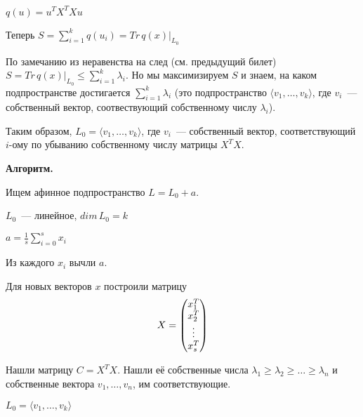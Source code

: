 $q(u) = u^TX^TXu$

Теперь $S = \sum\limits_{i = 1}^k q(u_i) = Tr\, q(x)|_{L_0}$

По замечанию из неравенства на след (см. предыдущий билет) $S = Tr\,q(x)|_{L_0} \le \sum\limits_{i = 1}^k \lambda_i$. Но мы максимизируем $S$ и знаем, на каком подпространстве достигается $\sum\limits_{i = 1}^k \lambda_i$ (это подпространство $\langle v_1,\ldots, v_k\rangle$, где $v_i$~--- собственный вектор, соотвествующий собственному числу $\lambda_i$).

Таким образом, $L_0 = \langle v_1,\ldots,v_k\rangle$, где $v_i$~--- собственный вектор, соответствующий $i$-ому по убыванию собственному числу матрицы $X^TX$.

{\bf Алгоритм.}

Ищем афинное подпространство $L = L_0 + a$.

$L_0$~--- линейное, $dim\,L_0 = k$

$a = \frac{1}{s}\sum\limits_{i = 0}^s x_i$

Из каждого $x_i$ вычли $a$.

Для новых векторов $x$ построили матрицу 
$$
X=\begin{pmatrix}
x_1^T\\
x_2^T\\
\vdots\\
x_s^T
\end{pmatrix}
$$

Нашли матрицу $C = X^TX$. Нашли её собственные числа $\lambda_1\ge\lambda_2\ge\ldots\ge\lambda_n$ и собственные вектора $v_1,\ldots, v_n$, им соответствующие.

$L_0 = \langle v_1,\ldots,v_k\rangle$
